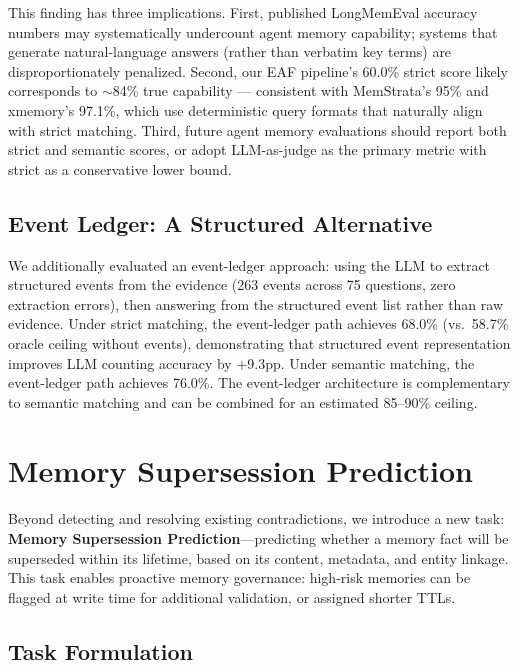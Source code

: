 \documentclass{article}
\begin{document}
This finding has three implications. First, published LongMemEval accuracy numbers may systematically undercount agent memory capability; systems that generate natural-language answers (rather than verbatim key terms) are disproportionately penalized. Second, our EAF pipeline's 60.0\% strict score likely corresponds to $\sim$84\% true capability --- consistent with MemStrata's 95\% and xmemory's 97.1\%, which use deterministic query formats that naturally align with strict matching. Third, future agent memory evaluations should report both strict and semantic scores, or adopt LLM-as-judge as the primary metric with strict as a conservative lower bound.

\subsection{Event Ledger: A Structured Alternative}

We additionally evaluated an event-ledger approach: using the LLM to extract structured events from the evidence (263 events across 75 questions, zero extraction errors), then answering from the structured event list rather than raw evidence. Under strict matching, the event-ledger path achieves 68.0\% (vs.\ 58.7\% oracle ceiling without events), demonstrating that structured event representation improves LLM counting accuracy by +9.3pp. Under semantic matching, the event-ledger path achieves 76.0\%. The event-ledger architecture is complementary to semantic matching and can be combined for an estimated 85--90\% ceiling.




\section{Memory Supersession Prediction}
\label{sec:supersession_pred}

Beyond detecting and resolving existing contradictions, we introduce a new task: \textbf{Memory Supersession Prediction}---predicting whether a memory fact will be superseded within its lifetime, based on its content, metadata, and entity linkage. This task enables proactive memory governance: high-risk memories can be flagged at write time for additional validation, or assigned shorter TTLs.

\subsection{Task Formulation}
\end{document}
